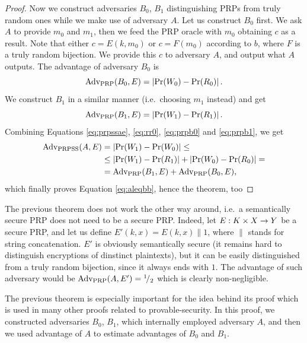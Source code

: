 \begin{proof}
	Now we construct adversaries $B_0$, $B_1$ distinguishing PRPs from truly random ones while we make use of adversary $A$. Let us construct $B_0$ first. We ask $A$ to provide $m_0$ and $m_1$, then we feed the PRP oracle with $m_0$ obtaining $c$ as a result. Note that either $c=E(k,m_0)$ or $c=F(m_0)$ according to $b$, where $F$ is a truly random bijection. We provide this $c$ to adversary $A$, and output what $A$ outputs. The advantage of adversary $B_0$ is
	\begin{equation}
	\label{eq:prpb0}
		\operatorname*{Adv_{PRP}}(B_0,E) = \left| \Pr(W_0) - \Pr(R_0) \right| .
	\end{equation}
	We construct $B_1$ in a similar manner (i.e.\ choosing $m_1$ instead) and get
	\begin{equation}
	\label{eq:prpb1}
		\operatorname*{Adv_{PRP}}(B_1,E) = \left| \Pr(W_1) - \Pr(R_1) \right| .
	\end{equation}
	Combining Equations \ref{eq:prpssae}, \ref{eq:rr0}, \ref{eq:prpb0} and \ref{eq:prpb1}, we get
	\begin{align*}
		\operatorname*{Adv_{PRPSS}}(A,E) &= \left| \Pr(W_1) - \Pr(W_0) \right| \leq \\
		&\leq \left| \Pr(W_1) - \Pr(R_1) \right| + \left| \Pr(W_0) - \Pr(R_0) \right| = \\
		&= \operatorname*{Adv_{PRP}}(B_1,E) + \operatorname*{Adv_{PRP}}(B_0,E) ,
	\end{align*}
	which finally proves Equation \ref{eq:aleqbb}, hence the theorem, too
\end{proof}

\begin{note}
	The previous theorem does not work the other way around, i.e.\ a semantically secure PRP does not need to be a secure PRP. Indeed, let $E: K\times X\rightarrow Y$ be a secure PRP, and let us define $E'(k,x) = E(k,x)\|1$, where $\|$ stands for string concatenation. $E'$ is obviously semantically secure (it remains hard to distinguish encryptions of dinstinct plaintexts), but it can be easily distinguished from a truly random bijection, since it always ends with $1$. The advantage of such adversary would be $\operatorname*{Adv_{PRP}}(A,E') = {}^{1}\!/_{2}$ which is clearly non-negligible.
\end{note}

The previous theorem is especially important for the idea behind its proof which is used in many other proofs related to provable-security. In this proof, we constructed adversaries $B_0$, $B_1$, which internally employed adversary $A$, and then we used advantage of $A$ to estimate advantages of $B_0$ and $B_1$.


